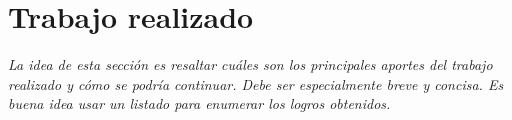
\section{Trabajo realizado}

\emph{La idea de esta sección es resaltar cuáles son los principales aportes del trabajo realizado y cómo se podría continuar. Debe ser especialmente breve y concisa. Es buena idea usar un listado para enumerar los logros obtenidos.}



%
%



